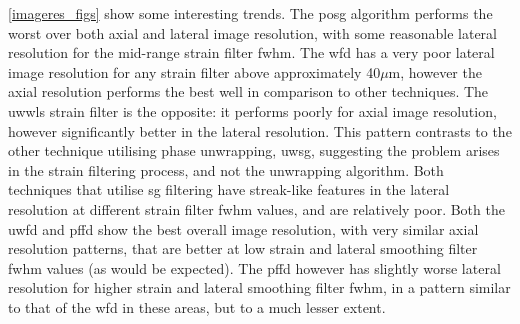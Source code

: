 \autoref{imageres_figs} show some interesting trends. The \ac{posg} algorithm performs the worst over both axial and lateral image resolution, with some reasonable lateral resolution for the mid-range strain filter \ac{fwhm}. The \ac{wfd} has a very poor lateral image resolution for any strain filter above approximately 40$\mu$m, however the axial resolution performs the best well in comparison to other techniques. The \ac{uwwls} strain filter is the opposite: it performs poorly for axial image resolution, however significantly better in the lateral resolution. 
This pattern contrasts to the other technique utilising phase unwrapping, \ac{uwsg}, suggesting the problem arises in the strain filtering process, and not the unwrapping algorithm. 
Both techniques that utilise \ac{sg} filtering have streak-like features in the lateral resolution at different strain filter \ac{fwhm} values, and are relatively poor. 
Both the \ac{uwfd} and \ac{pffd} show the best overall image resolution, with very similar axial resolution patterns, that are better at low strain and lateral smoothing filter \ac{fwhm} values (as would be expected). The \ac{pffd} however has slightly worse lateral resolution for higher strain and lateral smoothing filter \ac{fwhm}, in a pattern similar to that of the \ac{wfd} in these areas, but to a much lesser extent.

